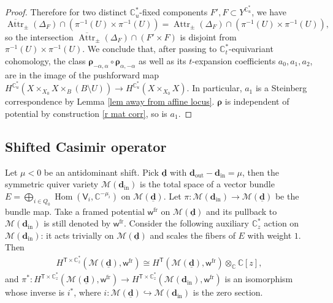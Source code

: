 \documentclass[10pt]{amsart}
\theoremstyle{definition}
\numberwithin{equation}{section}
\newcommand{\bC}{\mathbb{C}}
\newcommand{\bd}{\mathbf{d}}
\newcommand{\cH}{\mathcal{H}}
\newcommand{\cM}{\mathcal{M}}
\newcommand{\sA}{\mathsf{A}}
\newcommand{\sT}{\mathsf{T}}
\newcommand{\sW}{\mathsf{W}}
\newcommand{\sw}{\mathsf{w}}
\newcommand{\Attr}{\operatorname{Attr}}
\newcommand{\Hom}{\operatorname{Hom}}
\newcommand{\In}{\operatorname{in}}
\newcommand{\Out}{\operatorname{out}}
\begin{document}
\begin{proof}
Therefore for two distinct $\bC^*_u$-fixed components $F',F\subset Y^{\bC^*_u}$, we have $$\overline{\Attr}_\pm(\Delta_F)\cap (\pi^{-1}(U)\times \pi^{-1}(U))=\Attr_\pm(\Delta_F)\cap (\pi^{-1}(U)\times \pi^{-1}(U)),  $$ 
so the intersection $\overline{\Attr}_\pm(\Delta_F)\cap (F'\times F)$ is disjoint from $\pi^{-1}(U)\times \pi^{-1}(U)$.
We conclude that, after passing to $\bC^*_t$-equivariant cohomology, the class $\pmb \rho_{-\alpha,\alpha}\circ \pmb \rho_{\alpha,-\alpha}$ as well as its $t$-expansion coefficients $a_0,a_1,a_2$, are in the image of the pushforward map $H^{\bC^*_u}(X\times_{X_0} X\times_B(B\setminus U))\to H^{\bC^*_u}(X\times_{X_0} X)$. In particular, $a_1$ is a Steinberg correspondence by Lemma \ref{lem away from affine locus}. $\pmb\rho$ is independent of potential by construction \eqref{r mat corr}, so is $a_1$. 
\end{proof}



\subsection{Shifted Casimir operator}

Let $\mu<0$ be an antidominant shift. Pick $\underline{\bd}$ with $\bd_{\Out}-\bd_{\In}=\mu$, then the symmetric quiver variety $\cM(\bd_{\In})$ is the total space of a vector bundle $E=\bigoplus_{i\in Q_0}\Hom(\mathsf V_i,\bC^{-\mu_i})$ on $\cM(\underline{\bd})$. Let $\pi\colon \cM(\bd_{\In})\to \cM(\underline{\bd})$ be the bundle map. Take a framed potential $\sw^{\mathrm{fr}}$ on $\cM(\underline{\bd})$ and its pullback to $\cM(\bd_{\In})$ is still denoted by $\sw^{\mathrm{fr}}$. 
Consider the following auxiliary $\bC^*_z$ action on $\cM(\bd_{\In})$: it acts trivially on $\cM(\underline{\bd})$ and scales the fibers of $E$ with weight $1$. Then  
\begin{align*}
H^{\sT\times \bC^*_z}(\cM(\underline{\bd}),\sw^{\mathrm{fr}})\cong H^{\sT}(\cM(\underline{\bd}),\sw^{\mathrm{fr}})\otimes_\bC\bC[z],
\end{align*}
and $\pi^*\colon H^{\sT\times \bC^*_z}(\cM(\underline{\bd}),\sw^{\mathrm{fr}})\to H^{\sT\times \bC^*_z}(\cM(\bd_{\In}),\sw^{\mathrm{fr}})$ is an isomorphism whose inverse is $i^*$, where $i\colon \cM(\underline{\bd})\hookrightarrow \cM(\bd_{\In})$ is the zero section.
\end{document}
